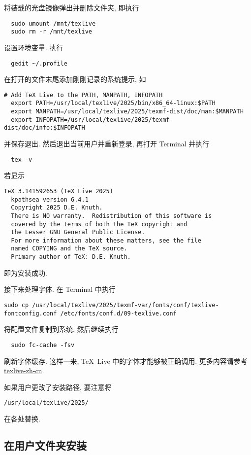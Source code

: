 将装载的光盘镜像弹出并删除文件夹,
即执行
\begin{lstlisting}
  sudo umount /mnt/texlive
  sudo rm -r /mnt/texlive
\end{lstlisting}

设置环境变量.
执行
\begin{lstlisting}
  gedit ~/.profile
\end{lstlisting}
在打开的文件末尾添加刚刚记录的系统提示,
如
\begin{lstlisting}[deletekeywords = local]
  # Add TeX Live to the PATH, MANPATH, INFOPATH
  export PATH=/usr/local/texlive/2025/bin/x86_64-linux:$PATH
  export MANPATH=/usr/local/texlive/2025/texmf-dist/doc/man:$MANPATH
  export INFOPATH=/usr/local/texlive/2025/texmf-dist/doc/info:$INFOPATH
\end{lstlisting}
并保存退出.
然后退出当前用户并重新登录,
再打开 \textsf{Terminal} 并执行
\begin{lstlisting}
  tex -v
\end{lstlisting}
若显示
\begin{lstlisting}[language = {}]
  TeX 3.141592653 (TeX Live 2025)
  kpathsea version 6.4.1
  Copyright 2025 D.E. Knuth.
  There is NO warranty.  Redistribution of this software is
  covered by the terms of both the TeX copyright and
  the Lesser GNU General Public License.
  For more information about these matters, see the file
  named COPYING and the TeX source.
  Primary author of TeX: D.E. Knuth.
\end{lstlisting}
即为安装成功.

接下来处理字体.
在 \textsf{Terminal} 中执行
\begin{lstlisting}[deletekeywords = local]
  sudo cp /usr/local/texlive/2025/texmf-var/fonts/conf/texlive-fontconfig.conf /etc/fonts/conf.d/09-texlive.conf
\end{lstlisting}
将配置文件复制到系统,
然后继续执行
\begin{lstlisting}
  sudo fc-cache -fsv
\end{lstlisting}
刷新字体缓存.
这样一来, \TeX~Live 中的字体才能够被正确调用.
更多内容请参考 \href{https://tug.org/texlive/doc/texlive-zh-cn/texlive-zh-cn.pdf}{\textsf{texlive-zh-cn}}.

如果用户更改了安装路径,
要注意将
\begin{lstlisting}[language = {}]
  /usr/local/texlive/2025/
\end{lstlisting}
在各处替换.

\subsection{在用户文件夹安装}\label{subsec:ubuntu-user-folder}


